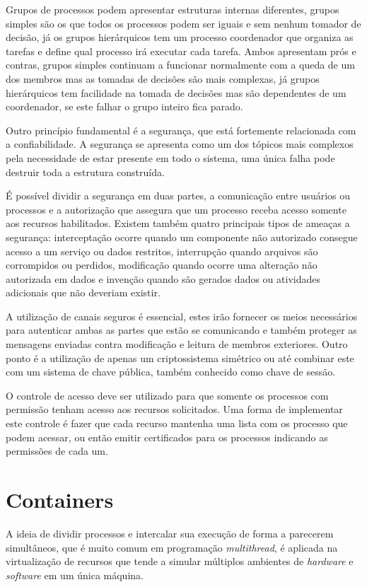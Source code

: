 	Grupos de processos podem apresentar estruturas internas diferentes, grupos simples são os que todos os processos podem ser iguais e sem nenhum tomador de decisão, já os grupos hierárquicos tem um processo coordenador que organiza as tarefas e define qual processo irá executar cada tarefa. Ambos apresentam prós e contras, grupos simples continuam a funcionar normalmente com a queda de um dos membros mas as tomadas de decisões são mais complexas, já grupos hierárquicos tem facilidade na tomada de decisões mas são dependentes de um coordenador, se este falhar o grupo inteiro fica parado.
	
	Outro princípio fundamental é a segurança, que está fortemente relacionada com a confiabilidade. A segurança se apresenta como um dos tópicos mais complexos pela necessidade de estar presente em todo o sistema, uma única falha pode destruir toda a estrutura construída.
	
	É possível dividir a segurança em duas partes, a comunicação entre usuários ou processos e a autorização que assegura que um processo receba acesso somente aos recursos habilitados. Existem também quatro principais tipos de ameaças a segurança: interceptação ocorre quando um componente não autorizado consegue acesso a um serviço ou dados restritos, interrupção quando arquivos são corrompidos ou perdidos, modificação quando ocorre uma alteração não autorizada em dados e invenção quando são gerados dados  ou atividades adicionais que não deveriam existir.
	
	A utilização de canais seguros é essencial, estes irão fornecer os meios necessários para autenticar ambas as partes que estão se comunicando e também proteger as mensagens enviadas contra modificação e leitura de membros exteriores. Outro ponto é a utilização de apenas um criptossistema simétrico ou até combinar este com um sistema de chave pública, também conhecido como chave de sessão.
	
	O controle de acesso deve ser utilizado para que somente os processos com permissão tenham acesso aos recursos solicitados. Uma forma de implementar este controle é fazer que cada recurso mantenha uma lista com os processo que podem acessar, ou então emitir certificados para os processos indicando as permissões de cada um.
	
\section{Containers}
	A ideia de dividir processos e intercalar sua execução de forma a parecerem simultâneos, que é muito comum em programação \textit{multithread}, é aplicada na virtualização de recursos que tende a simular múltiplos ambientes de \textit{hardware} e \textit{software} em um única máquina.
	
